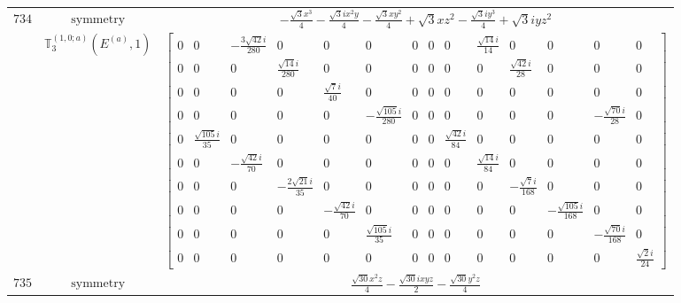 \documentclass[fleqn,8pt,landscape]{jsarticle}
\begin{document}
\begin{longtable}{ccc}
$ 734 $ & $ \text{symmetry} $ & $ - \frac{\sqrt{3} x^{3}}{4} - \frac{\sqrt{3} i x^{2} y}{4} - \frac{\sqrt{3} x y^{2}}{4} + \sqrt{3} x z^{2} - \frac{\sqrt{3} i y^{3}}{4} + \sqrt{3} i y z^{2} $ \\
$  $ & $ \mathbb{T}_{3}^{(1,0;a)}(E^{(a)},1) $ & $ \begin{bmatrix} 0 & 0 & - \frac{3 \sqrt{42} i}{280} & 0 & 0 & 0 & 0 & 0 & 0 & \frac{\sqrt{14} i}{14} & 0 & 0 & 0 & 0 \\ 0 & 0 & 0 & \frac{\sqrt{14} i}{280} & 0 & 0 & 0 & 0 & 0 & 0 & \frac{\sqrt{42} i}{28} & 0 & 0 & 0 \\ 0 & 0 & 0 & 0 & \frac{\sqrt{7} i}{40} & 0 & 0 & 0 & 0 & 0 & 0 & 0 & 0 & 0 \\ 0 & 0 & 0 & 0 & 0 & - \frac{\sqrt{105} i}{280} & 0 & 0 & 0 & 0 & 0 & 0 & - \frac{\sqrt{70} i}{28} & 0 \\ 0 & \frac{\sqrt{105} i}{35} & 0 & 0 & 0 & 0 & 0 & 0 & \frac{\sqrt{42} i}{84} & 0 & 0 & 0 & 0 & 0 \\ 0 & 0 & - \frac{\sqrt{42} i}{70} & 0 & 0 & 0 & 0 & 0 & 0 & \frac{\sqrt{14} i}{84} & 0 & 0 & 0 & 0 \\ 0 & 0 & 0 & - \frac{2 \sqrt{21} i}{35} & 0 & 0 & 0 & 0 & 0 & 0 & - \frac{\sqrt{7} i}{168} & 0 & 0 & 0 \\ 0 & 0 & 0 & 0 & - \frac{\sqrt{42} i}{70} & 0 & 0 & 0 & 0 & 0 & 0 & - \frac{\sqrt{105} i}{168} & 0 & 0 \\ 0 & 0 & 0 & 0 & 0 & \frac{\sqrt{105} i}{35} & 0 & 0 & 0 & 0 & 0 & 0 & - \frac{\sqrt{70} i}{168} & 0 \\ 0 & 0 & 0 & 0 & 0 & 0 & 0 & 0 & 0 & 0 & 0 & 0 & 0 & \frac{\sqrt{2} i}{24} \end{bmatrix} $ \\ \hline
$ 735 $ & $ \text{symmetry} $ & $ \frac{\sqrt{30} x^{2} z}{4} - \frac{\sqrt{30} i x y z}{2} - \frac{\sqrt{30} y^{2} z}{4} $ \\

\end{longtable}
\end{document}
